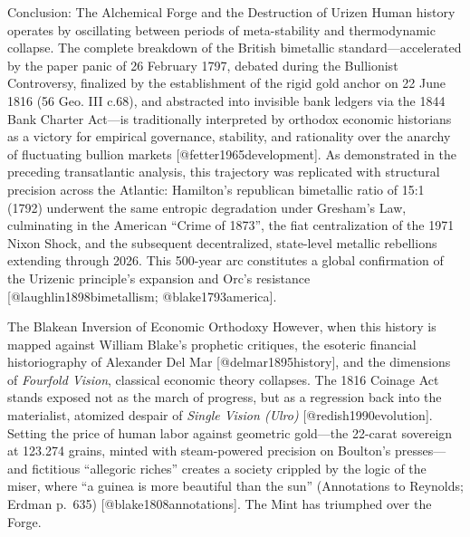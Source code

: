 \documentclass[
  ignorenonframetext,
]{beamer}
\author{\texorpdfstring{}{}}
\date{}
\begin{document}
\begin{frame}{Conclusion: The Alchemical Forge and the Destruction of
Urizen}
\protect{}\label{conclusion-the-alchemical-forge-and-the-destruction-of-urizen}
Human history operates by oscillating between periods of meta-stability
and thermodynamic collapse. The complete breakdown of the British
bimetallic standard---accelerated by the paper panic of 26 February
1797, debated during the Bullionist Controversy, finalized by the
establishment of the rigid gold anchor on 22 June 1816 (56 Geo. III
c.68), and abstracted into invisible bank ledgers via the 1844 Bank
Charter Act---is traditionally interpreted by orthodox economic
historians as a victory for empirical governance, stability, and
rationality over the anarchy of fluctuating bullion markets
{[}@fetter1965development{]}. As demonstrated in the preceding
transatlantic analysis, this trajectory was replicated with structural
precision across the Atlantic: Hamilton's republican bimetallic ratio of
15:1 (1792) underwent the same entropic degradation under Gresham's Law,
culminating in the American ``Crime of 1873'', the fiat centralization
of the 1971 Nixon Shock, and the subsequent decentralized, state-level
metallic rebellions extending through 2026. This 500-year arc
constitutes a global confirmation of the Urizenic principle's expansion
and Orc's resistance {[}@laughlin1898bimetallism; @blake1793america{]}.

\begin{block}{The Blakean Inversion of Economic Orthodoxy}
\protect{}\label{the-blakean-inversion-of-economic-orthodoxy}
However, when this history is mapped against William Blake's prophetic
critiques, the esoteric financial historiography of Alexander Del Mar
{[}@delmar1895history{]}, and the dimensions of \emph{Fourfold Vision},
classical economic theory collapses. The 1816 Coinage Act stands exposed
not as the march of progress, but as a regression back into the
materialist, atomized despair of \emph{Single Vision (Ulro)}
{[}@redish1990evolution{]}. Setting the price of human labor against
geometric gold---the 22-carat sovereign at 123.274 grains, minted with
steam-powered precision on Boulton's presses---and fictitious
``allegoric riches'' creates a society crippled by the logic of the
miser, where ``a guinea is more beautiful than the sun'' (Annotations to
Reynolds; Erdman p.~635) {[}@blake1808annotations{]}. The Mint has
triumphed over the Forge.
\end{block}


\end{frame}
\end{document}
